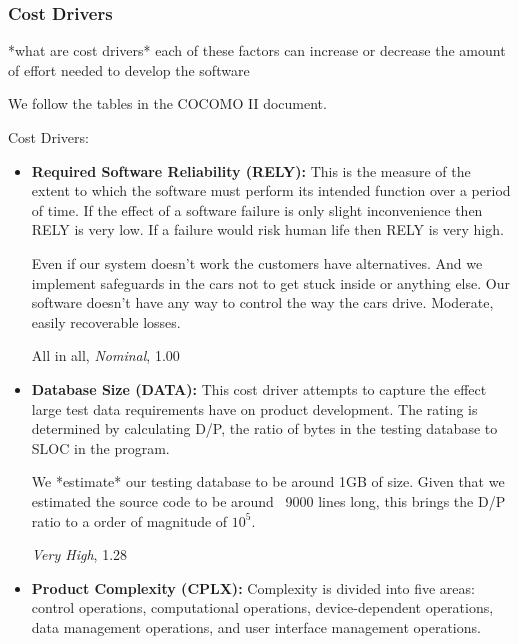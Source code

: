 \documentclass[english]{article}
\begin{document}
\subsubsection{Cost Drivers}

*what are cost drivers*
each of these factors can increase or decrease the amount of effort needed to develop the software

We follow the tables in the COCOMO II document.


Cost Drivers:
\begin{itemize}

\item \textbf{Required Software Reliability (RELY):} This is the measure of the extent to which the software must perform its intended function over a period of time. If the effect of a software failure is only slight inconvenience then RELY is very low. If a failure would risk human life then RELY is very high.

Even if our system doesn't work the customers have alternatives. And we implement safeguards in the cars not to get stuck inside or anything else. Our software doesn't have any way to control the way the cars drive.
Moderate, easily recoverable losses.

All in all, \textit{Nominal}, 1.00

\item \textbf{Database Size (DATA):} This cost driver attempts to capture the effect large test data requirements have on product development. The rating is determined by calculating D/P, the ratio of bytes in the testing database to SLOC in the program.

We *estimate* our testing database to be around 1GB of size. Given that we estimated the source code to be around ~9000 lines long, this brings the D/P ratio to a order of magnitude of $10^5$.

\textit{Very High}, 1.28 


\item \textbf{Product Complexity (CPLX):} Complexity is divided into five areas: control operations, computational operations,
device-dependent operations, data management operations, and user interface management operations.


\end{itemize}
\end{document}
